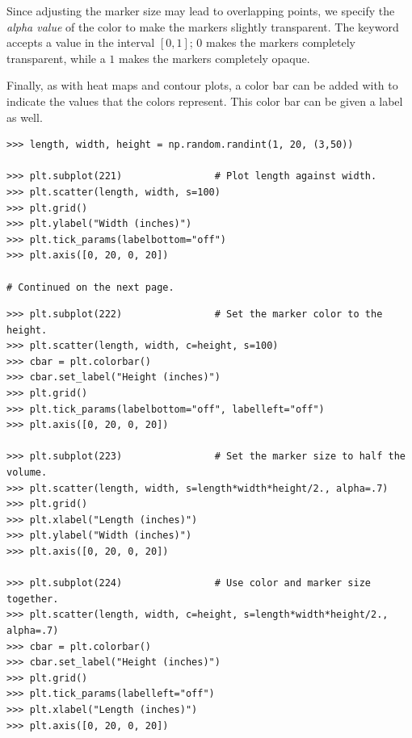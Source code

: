 Since adjusting the marker size may lead to overlapping points, we specify the \emph{alpha value} of the color to make the markers slightly transparent.
The keyword  accepts a value in the interval $[0,1]$; 0 makes the markers completely transparent, while a $1$ makes the markers completely opaque.

Finally, as with heat maps and contour plots, a color bar can be added with  to indicate the values that the colors represent.
This color bar can be given a label as well.

\begin{lstlisting}
>>> length, width, height = np.random.randint(1, 20, (3,50))

>>> plt.subplot(221)                # Plot length against width.
>>> plt.scatter(length, width, s=100)
>>> plt.grid()
>>> plt.ylabel("Width (inches)")
>>> plt.tick_params(labelbottom="off")
>>> plt.axis([0, 20, 0, 20])

# Continued on the next page.
\end{lstlisting}

\newpage

\begin{lstlisting}
>>> plt.subplot(222)                # Set the marker color to the height.
>>> plt.scatter(length, width, c=height, s=100)
>>> cbar = plt.colorbar()
>>> cbar.set_label("Height (inches)")
>>> plt.grid()
>>> plt.tick_params(labelbottom="off", labelleft="off")
>>> plt.axis([0, 20, 0, 20])

>>> plt.subplot(223)                # Set the marker size to half the volume.
>>> plt.scatter(length, width, s=length*width*height/2., alpha=.7)
>>> plt.grid()
>>> plt.xlabel("Length (inches)")
>>> plt.ylabel("Width (inches)")
>>> plt.axis([0, 20, 0, 20])

>>> plt.subplot(224)                # Use color and marker size together.
>>> plt.scatter(length, width, c=height, s=length*width*height/2., alpha=.7)
>>> cbar = plt.colorbar()
>>> cbar.set_label("Height (inches)")
>>> plt.grid()
>>> plt.tick_params(labelleft="off")
>>> plt.xlabel("Length (inches)")
>>> plt.axis([0, 20, 0, 20])
\end{lstlisting}

